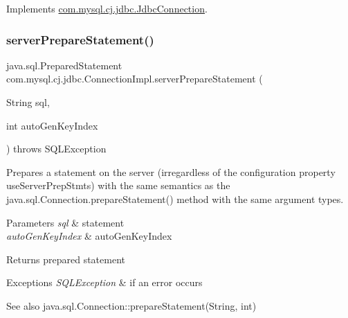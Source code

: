 Implements \mbox{\hyperlink{interfacecom_1_1mysql_1_1cj_1_1jdbc_1_1_jdbc_connection_add415475386bd7577301fddbdd5518b8}{com.\+mysql.\+cj.\+jdbc.\+Jdbc\+Connection}}.

\mbox{\label{classcom_1_1mysql_1_1cj_1_1jdbc_1_1_connection_impl_abd651a25d34961e6b9e8b5938f57222f}} 
\subsubsection{\texorpdfstring{server\+Prepare\+Statement()}{serverPrepareStatement()}\hspace{0.1cm}{\footnotesize\ttfamily [2/6]}}
{\footnotesize\ttfamily java.\+sql.\+Prepared\+Statement com.\+mysql.\+cj.\+jdbc.\+Connection\+Impl.\+server\+Prepare\+Statement (\begin{DoxyParamCaption}\item[{String}]{sql,  }\item[{int}]{auto\+Gen\+Key\+Index }\end{DoxyParamCaption}) throws S\+Q\+L\+Exception}

Prepares a statement on the server (irregardless of the configuration property \textquotesingle{}use\+Server\+Prep\+Stmts\textquotesingle{}) with the same semantics as the java.\+sql.\+Connection.\+prepare\+Statement() method with the same argument types.


\begin{DoxyParams}{Parameters}
{\em sql} & statement \\
\hline
{\em auto\+Gen\+Key\+Index} & auto\+Gen\+Key\+Index \\
\hline
\end{DoxyParams}
\begin{DoxyReturn}{Returns}
prepared statement 
\end{DoxyReturn}

\begin{DoxyExceptions}{Exceptions}
{\em S\+Q\+L\+Exception} & if an error occurs \\
\hline
\end{DoxyExceptions}
\begin{DoxySeeAlso}{See also}
java.\+sql.\+Connection\+::prepare\+Statement(\+String, int) 
\end{DoxySeeAlso}


